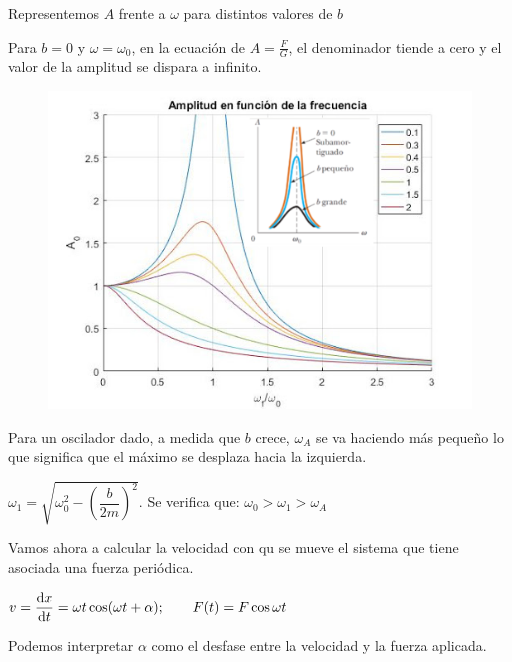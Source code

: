 Representemos $A$ frente a $\omega$ para distintos valores de $b$

Para $b=0$ y $\omega=\omega_0$, en la ecuación de $A=\frac F G$, el denominador tiende a cero y el valor de la amplitud se dispara a infinito.
\begin{figure}[H]
		\centering
		\includegraphics[width=.75\textwidth]{imagenes/imagenes20/T20IM08.png}
\end{figure}	

Para un oscilador dado, a medida que $b$ crece, $\omega_A$ se va haciendo más pequeño lo que significa que el máximo se desplaza hacia la izquierda.

$\omega_1=\sqrt{\omega_0^2-\left( \dfrac b{2m} \right)^2}$. \hspace{5mm} Se verifica que: $\omega_0>\omega_1>\omega_A$

Vamos ahora a calcular la velocidad con qu se mueve el sistema que tiene asociada una fuerza periódica.

$\displaystyle v=\dv{x}{t}=\omega t \cos(\omega t + \alpha); \qquad F(t)=F\cos \omega t$

Podemos interpretar $\alpha$ como el desfase entre la velocidad y la fuerza aplicada.

